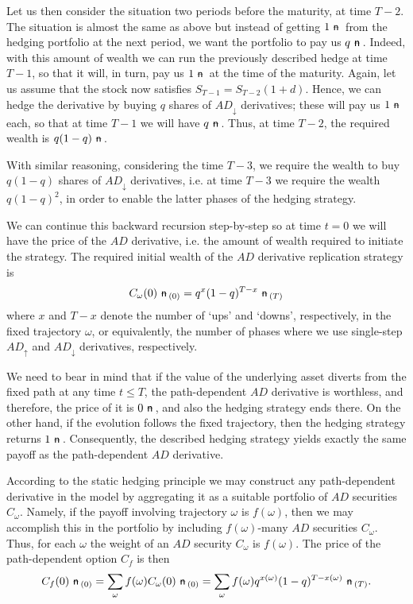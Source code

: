 \documentclass{amsart}
\theoremstyle{definition}
\theoremstyle{remark}
\newcommand{\n}{\!\!\ \nn \!\!\ }
\def\nn{\mathrel{%
    \mathchoice{\n}{\n}{\scriptsize\n}{\tiny\n}%
}}
\def\n {{%
    \setbox0\hbox{ \textsf{n}\!\  }%
    \rlap{\hbox to \wd0{\hss \!\ --\hss}}\box0
}}
\numberwithin{equation}{section}
\newcommand{\1}{\boldsymbol{1}}
\newcommand{\ua}{\uparrow}
\newcommand{\da}{\downarrow}
\begin{document}
Let us then consider the situation two periods before the maturity, at time $T-2$. The situation is almost the same as above but instead of getting $1\n$ from the hedging portfolio at the next period, we want the portfolio to pay us $q\n$. Indeed, with this amount of wealth we can run the previously described hedge at time $T-1$, so that it will, in turn, pay us $1\n$ at the time of the maturity. Again, let us assume that the stock now satisfies $S_{T-1}=S_{T-2}(1+d)$. Hence, we can hedge the derivative by buying $q$ shares of $AD_{\da}$ derivatives; these will pay us $1\n$ each, so that at time $T-1$ we will have $q\n$. Thus, at time $T-2$, the required wealth is $q(1-q)\n$.

With similar reasoning, considering the time $T-3$, we require the wealth to buy $q(1-q)$ shares of $AD_{\da}$ derivatives, i.e. at time $T-3$ we require the wealth $q(1-q)^2$, in order to enable the latter phases of the hedging strategy.

We can continue this backward recursion step-by-step so at time $t=0$ we will have the price of the $AD$ derivative, i.e. the amount of wealth required to initiate the strategy. The required initial wealth of the $AD$ derivative replication 
strategy is
\begin{equation}
\label{Eq:ADprice}
C_{\omega}(0) \n_{(0)} =q^x(1-q)^{T-x} \n_{(T)}
\end{equation}
where $x$ and $T-x$ denote the number of `ups' and `downs', respectively, in the fixed trajectory $\omega$, or equivalently, the number of phases where we use single-step $AD_{\ua}$ and $AD_{\da}$ derivatives, respectively. 

We need to bear in mind that if the value of the underlying asset diverts from the fixed path at any time $t\leq T$, the path-dependent $AD$ derivative is worthless, and therefore, the price of it is $0\n$, and also the hedging strategy ends there. On the other hand, if the evolution follows the fixed trajectory, then the hedging strategy returns $1\n$.
Consequently, the described hedging strategy yields exactly the same payoff as the path-dependent $AD$ derivative.
 
According to the static hedging principle we may construct any path-dependent derivative in the model by aggregating it as 
a suitable portfolio of $AD$ securities $C_\omega$. Namely, if the payoff involving trajectory $\omega$ is $f(\omega)$, then
we may accomplish this in the portfolio by including $f(\omega)$-many $AD$ securities $C_\omega$. Thus, for each $\omega$ the weight of an $AD$ security $C_\omega$ is $f(\omega)$. The price of the path-dependent option $C_f$ is then 
\begin{equation}\label{eq: pathdep}
C_f (0) \n_{(0)} = \sum_\omega f(\omega) C_\omega (0) \n_{(0)} = \sum_\omega f(\omega) q^{x(\omega)} 
(1-q)^{T-x(\omega)} \n_{(T)}.
\end{equation}
 
\end{document}
